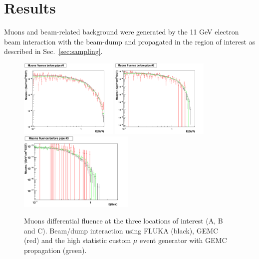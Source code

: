 \section{Results}\label{sec:results}

Muons and beam-related background  were generated by the 11 GeV electron beam interaction with the beam-dump and propagated in the region of interest as described in  Sec.~\ref{sec:sampling}. 

\begin{figure}[h!] 
\center
\includegraphics[width=4.7cm]{figs/comparisonMuonsPipe1_1D.pdf}
\includegraphics[width=4.7cm]{figs/comparisonMuonsPipe2_1D.pdf}
\includegraphics[width=5.5cm]{figs/comparisonMuonsPipe3_1D.pdf}
\caption{Muons differential fluence at the three locations of interest (A, B and C). Beam/dump interaction using  FLUKA (black), GEMC (red) and the high statistic custom $\mu$ event generator with GEMC propagation (green).}
\label{fig:mu-comp}
\end{figure}


